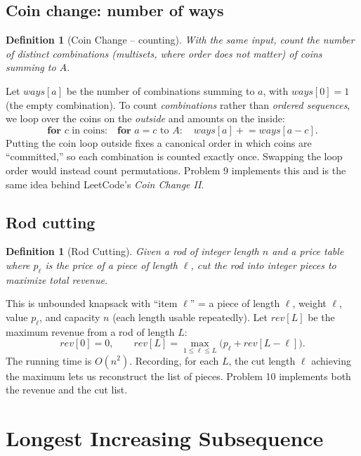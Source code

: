\documentclass[11pt]{article}
\newtheorem{definition}[theorem]{Definition}
\begin{document}
\subsection{Coin change: number of ways}

\begin{definition}[Coin Change -- counting]
With the same input, count the number of distinct \emph{combinations} (multisets, where
order does not matter) of coins summing to $A$.
\end{definition}

Let $\mathit{ways}[a]$ be the number of combinations summing to $a$, with $\mathit{ways}[0]
= 1$ (the empty combination). To count \emph{combinations} rather than \emph{ordered
sequences}, we loop over the coins on the \emph{outside} and amounts on the inside:
\[
\textbf{for } c \text{ in coins:}\quad \textbf{for } a = c \text{ to } A:\quad
\mathit{ways}[a] \mathrel{+}= \mathit{ways}[a - c].
\]
Putting the coin loop outside fixes a canonical order in which coins are ``committed,'' so
each combination is counted exactly once. Swapping the loop order would instead count
permutations. Problem 9 implements this and is the same idea behind LeetCode's
\emph{Coin Change II}.

\subsection{Rod cutting}

\begin{definition}[Rod Cutting]
Given a rod of integer length $n$ and a price table where $p_\ell$ is the price of a piece
of length $\ell$, cut the rod into integer pieces to maximize total revenue.
\end{definition}

This is unbounded knapsack with ``item $\ell$'' = a piece of length $\ell$, weight $\ell$,
value $p_\ell$, and capacity $n$ (each length usable repeatedly). Let $\mathit{rev}[L]$ be
the maximum revenue from a rod of length $L$:
\[
\mathit{rev}[0] = 0, \qquad
\mathit{rev}[L] = \max_{1 \le \ell \le L}\bigl(p_\ell + \mathit{rev}[L - \ell]\bigr).
\]
The running time is $O(n^2)$. Recording, for each $L$, the cut length $\ell$ achieving the
maximum lets us reconstruct the list of pieces. Problem 10 implements both the revenue and
the cut list.

\section{Longest Increasing Subsequence}
\end{document}
